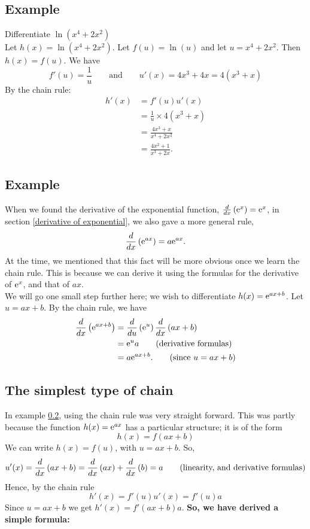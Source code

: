 \subsection{Example}
Differentiate $\ln(x^4 + 2x^2)$ \\

\solution
Let $h(x) = \ln(x^4 + 2x^2)$. Let $f(u) = \ln(u)$ and let $u = x^4 + 2x^2$. Then $h(x) = f(u)$. We have
\[
f'(u) = \frac{1}{u} \qquad \text{and} \qquad u'(x) = 4x^3 + 4x = 4(x^3 + x)
\]
By the chain rule:
\begin{align*}
h'(x) & = f'(u)u'(x) \\
	& = \frac{1}{u}\times4(x^3 + x) \tag{plugging in our results} \\
	& = \frac{4x^3 + x}{x^4 + 2x^2} \tag{since $u = x^4 + 2x^2$} \\
	& = \frac{4x^2 + 1}{x^3 + 2x}. \tag{cancelling common factor, $x$}
\end{align*}

\subsection{Example} \label{ex16.1}
\noindent When we found the derivative of the exponential function, $\frac{d}{dx}\left(\mathrm{e}^{x}\right) = \mathrm{e}^x$, in section \ref{derivative of exponential}, we also gave a more general rule,
\[
\frac{d}{dx}\left( \mathrm{e}^{ax}\right) = a\mathrm{e}^{ax}.
\]
At the time, we mentioned that this fact will be more obvious once we learn the chain rule. This is because we can derive it using the formulas for the derivative of $\mathrm{e}^x$, and that of $ax$. \\

\noindent We will go one small step further here; we wish to differentiate $h(x) = \mathrm{e}^{ax+b}$. Let $u = ax+b$.
By the chain rule, we have
\begin{align*}
\frac{d}{dx}\left(\mathrm{e}^{ax+b}\right) & = \frac{d}{du}\left(\mathrm{e}^{u}\right)\frac{d}{dx}\left(ax+b\right) \\
					     & = \mathrm{e}^ua \tag{derivative formulas} \\
					     & = a\mathrm{e}^{ax+b}. \tag{since $u = ax+b$}
\end{align*}

\subsection{The simplest type of chain} \label{simplest chain}
In example \ref{ex16.1}, using the chain rule was very straight forward. This was partly because the function $h(x) = \mathrm{e}^{ax}$ has a particular structure; it is of the form 
\[
h(x) = f(ax + b) \tag{where $f(x) = \e^x$}
\]
We can write $h(x) = f(u)$, with $u = ax + b$. So,
\[
u'(x) = \frac{d}{dx}\left(ax+b\right) = \frac{d}{dx}\left(ax\right) + \frac{d}{dx}\left(b\right) = a \tag{linearity, and derivative formulas}
\]
Hence, by the chain rule
\[
h'(x) = f'(u)u'(x) = f'(u)a
\]
Since $u = ax+b$ we get $h'(x) = f'(ax+b)a$. \textbf{So, we have derived a simple formula:}

